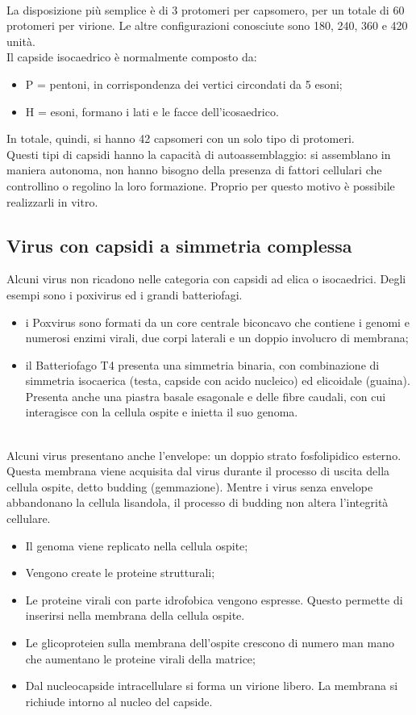 \\La disposizione pi\`u semplice \`e di 3 protomeri per capsomero, per un totale di 60 protomeri per virione. Le altre configurazioni conosciute sono 180, 240, 360 e 420 unit\`a.  
\\Il capside isocaedrico \`e normalmente composto da: \begin{itemize}
    \item P = pentoni, in corrispondenza dei vertici
    circondati da 5 esoni;
    \item H = esoni, formano i lati e le facce dell'icosaedrico. 
\end{itemize}
In totale, quindi, si hanno 42 capsomeri con un solo tipo di protomeri.
\\Questi tipi di capsidi hanno la capacit\`a di autoassemblaggio: si assemblano in maniera autonoma, non hanno bisogno della presenza di fattori cellulari che controllino o regolino la loro formazione. Proprio per questo motivo \`e possibile realizzarli in vitro.
\subsection{Virus con capsidi a simmetria complessa}
Alcuni virus non ricadono nelle categoria con capsidi ad elica o isocaedrici. Degli esempi sono i poxivirus ed i grandi batteriofagi. 
\begin{itemize}
    \item i Poxvirus sono formati da un core centrale biconcavo che contiene i genomi e numerosi enzimi virali, due corpi laterali e un doppio involucro di membrana; 
    \item il Batteriofago T4 presenta una simmetria binaria, con combinazione di simmetria isocaerica (testa, capside con acido nucleico) ed elicoidale (guaina). Presenta anche una piastra basale esagonale e delle fibre caudali, con cui interagisce con la cellula ospite e inietta il suo genoma.
\end{itemize}
\\Alcuni virus presentano anche l'envelope: un doppio strato fosfolipidico esterno. Questa membrana viene acquisita dal virus durante il processo di uscita della cellula ospite, detto budding (gemmazione). Mentre i virus senza envelope abbandonano la cellula lisandola, il processo di budding non altera l'integrit\`a cellulare.
\begin{itemize}
    \item Il genoma viene replicato nella cellula ospite; 
    \item Vengono create le proteine strutturali; 
    \item Le proteine virali con parte idrofobica vengono espresse. Questo permette di inserirsi nella membrana della cellula ospite.
    \item Le glicoproteien sulla membrana dell'ospite crescono di numero man mano che aumentano le proteine virali della matrice;
    \item Dal nucleocapside intracellulare si forma un virione libero. La membrana si richiude intorno al nucleo del capside.
\end{itemize}
